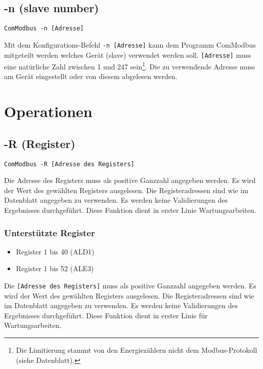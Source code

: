 \documentclass[Bachelorarbeit.tex]{subfiles}
\begin{document}
\subsection*{-n (slave number)}
\begin{verbatim}
ComModbus -n [Adresse]
\end{verbatim}
Mit dem Konfigurations-Befehl \texttt{-n [Adresse]} kann dem Programm ComModbus 
mitgeteilt werden welches Gerät (slave) verwendet werden soll. \texttt{[Adresse]} muss 
eine natürliche Zahl zwischen 1 und 247 sein\footnote{Die Limitierung stammt von den Energiezählern nicht dem Modbus-Protokoll (siehe Datenblatt).}. Die zu verwendende Adresse muss 
am Gerät eingestellt oder von diesem abgelesen werden.

\newpage

\section{Operationen}

\subsection*{-R (Register)}
\begin{verbatim}
ComModbus -R [Adresse des Registers]
\end{verbatim}
Die Adresse des Registers muss als positive Ganzzahl angegeben werden. Es wird 
der Wert des gewählten Registers ausgelesen. Die Registeradressen sind wie im 
Datenblatt angegeben zu verwenden. Es werden keine Validierungen des 
Ergebnisses durchgeführt. Diese Funktion dient in erster Linie Wartungsarbeiten.

\subsubsection*{Unterstützte Register}
\begin{itemize}
\itemsep0em
\item Register 1 bis 40 (ALD1)
\item Register 1 bis 52 (ALE3)
\end{itemize}
Die \texttt{[Adresse des Registers]} muss als positive Ganzzahl angegeben werden. Es wird der Wert des gewählten Registers ausgelesen. Die Registeradressen sind wie im Datenblatt angegeben zu verwenden. Es werden keine Validierungen des 
Ergebnisses durchgeführt. Diese Funktion dient in erster Linie für Wartungsarbeiten.\\
\end{document}
